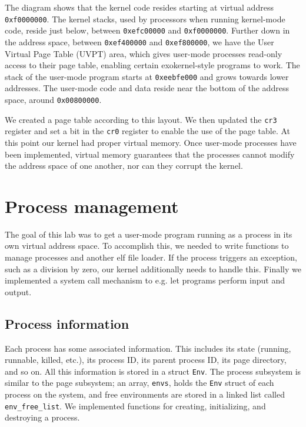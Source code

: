 \documentclass{article}
\begin{document}
The diagram shows that the kernel code resides starting at virtual address
\texttt{0xf0000000}. The kernel stacks, used by processors when running
kernel-mode code, reside just below, between \texttt{0xefc00000} and
\texttt{0xf0000000}. Further down in the address space, between
\texttt{0xef400000} and \texttt{0xef800000}, we have the User Virtual Page
Table (UVPT) area, which gives user-mode processes read-only access to their
page table, enabling certain exokernel-style programs to work. The stack of
the user-mode program starts at \texttt{0xeebfe000} and grows towards lower
addresses. The user-mode code and data reside near the bottom of the address
space, around \texttt{0x00800000}.

We created a page table according to this layout. We then updated the
\texttt{cr3} register and set a bit in the \texttt{cr0} register to enable the
use of the page table. At this point our kernel had proper virtual memory.
Once user-mode processes have been implemented, virtual memory guarantees that
the processes cannot modify the address space of one another, nor can they
corrupt the kernel.


\section{Process management}

The goal of this lab was to get a user-mode program running as a process in
its own virtual address space. To accomplish this, we needed to write
functions to manage processes and another \gls{elf} file loader. If the process
triggers an exception, such as a division by zero, our kernel additionally
needs to handle this. Finally we implemented a system call mechanism to e.g.
let programs perform input and output.

\subsection{Process information}
Each process has some associated information. This includes its state
(running, runnable, killed, etc.), its process ID, its parent process ID, its
page directory, and so on. All this information is stored in a struct
\texttt{Env}. The process subsystem is similar to the page subsystem; an
array, \texttt{envs}, holds the \texttt{Env} struct of each process on the
system, and free environments are stored in a linked list called
\texttt{env\_free\_list}. We implemented functions for creating, initializing,
and destroying a process.
\end{document}
